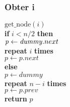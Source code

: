 \documentclass{beamer}
\begin{document}
\begin{frame}
\frametitle{Obter i}
\begin{oframed}
\begin{flushleft}
\hspace*{1em} \ensuremath{\mathrm{get\_node}(\ensuremath{\mathit{i}})}\\
\hspace*{1em} \hspace*{1em} {\color{black} \textbf{if}} \ensuremath{\ensuremath{\mathit{i}} < \ensuremath{\mathit{n}}/2} {\color{black} \textbf{then}} \\
\hspace*{1em} \hspace*{1em} \hspace*{1em} \ensuremath{\ensuremath{\mathit{p}} \gets  \ensuremath{\ensuremath{\mathit{dummy}}.next}\hspace*{1em} }\\
\hspace*{1em} \hspace*{1em} \hspace*{1em} {\color{black} \textbf{repeat}} \ensuremath{i} {\color{black} \textbf{times}} \\
\hspace*{1em} \hspace*{1em} \hspace*{1em} \hspace*{1em} \ensuremath{\ensuremath{\mathit{p}} \gets  \ensuremath{\ensuremath{\mathit{p}}.next}}\\
\hspace*{1em} \hspace*{1em} {\color{black} \textbf{else}} \\
\hspace*{1em} \hspace*{1em} \hspace*{1em} \ensuremath{\ensuremath{\mathit{p}} \gets  \ensuremath{dummy}}\\
\hspace*{1em} \hspace*{1em} \hspace*{1em} {\color{black} \textbf{repeat}} \ensuremath{\ensuremath{\mathit{n}}-i} {\color{black} \textbf{times}} \\
\hspace*{1em} \hspace*{1em} \hspace*{1em} \hspace*{1em} \ensuremath{\ensuremath{\mathit{p}} \gets  \ensuremath{\ensuremath{\mathit{p}}.prev}}\\
\hspace*{1em} \hspace*{1em} {\color{black} \textbf{return}} \ensuremath{\ensuremath{\mathit{p}}}\\
\end{flushleft}
\end{oframed}
\end{frame}
\end{document}
